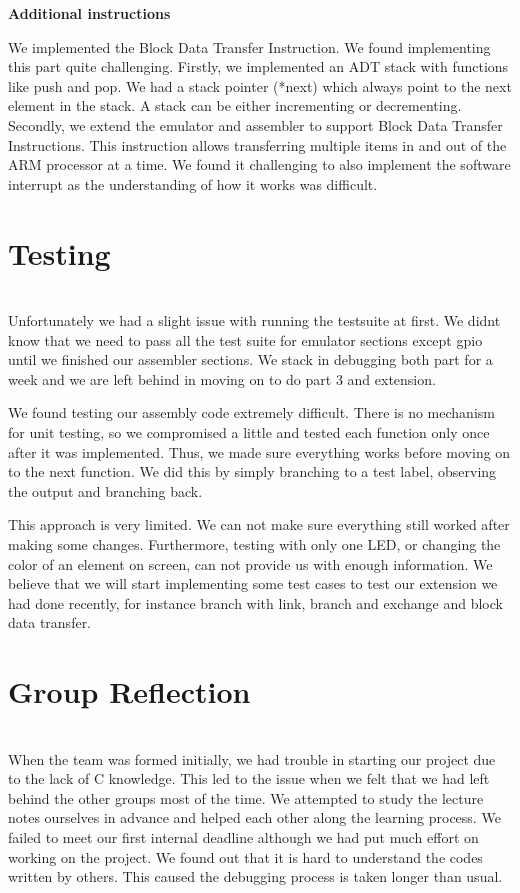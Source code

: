 \documentclass[9pt]{article}
\begin{document}
 
  \begin{table}[h]
        \centering
      \caption*{\bf Additional instructions}
    \end{table}
   
    We implemented the Block Data Transfer Instruction. We found implementing this part quite challenging. Firstly, we implemented an ADT stack with functions like push and pop. We had a stack pointer (*next) which always point to the next element in the stack. A stack can be either incrementing or decrementing. Secondly, we extend the emulator and assembler to support Block Data Transfer Instructions. This instruction allows transferring multiple items in and out of the ARM processor at a time. We found it challenging to also implement the software interrupt as the understanding of how it works was difficult. 



\pagebreak

\section{Testing} \hfill \\
    Unfortunately we had a slight issue with running the testsuite at first. We didnt know that we need to pass all the test suite for emulator sections except gpio until we finished our assembler sections. We stack in debugging both part for a week and we are left behind in moving on to do part 3 and extension.
    
    We found testing our assembly code extremely difficult. There is no mechanism for unit testing, so we compromised a little and tested each function only once after it was implemented. Thus, we made sure everything works before moving on to the next function. We did this by simply branching to a test label, observing the output and branching back.
    
    This approach is very limited. We can not make sure everything still worked after making some changes. Furthermore, testing with only one LED, or changing the color of an element on screen, can not provide us with enough information. We believe that we will start implementing some test cases to test our extension we had done recently, for instance branch with link, branch and exchange and block data transfer.



\section{Group Reflection} \hfill \\
When the team was formed initially, we had trouble in starting our project due to the lack of C knowledge. This led to the issue when we felt that we had left behind the other groups most of the time. We attempted to study the lecture notes ourselves in advance and helped each other along the learning process. We failed to meet our first internal deadline although we had put much effort on working on the project. We found out that it is hard to understand the codes written by others. This caused the debugging process is taken longer than usual. 
\end{document}
